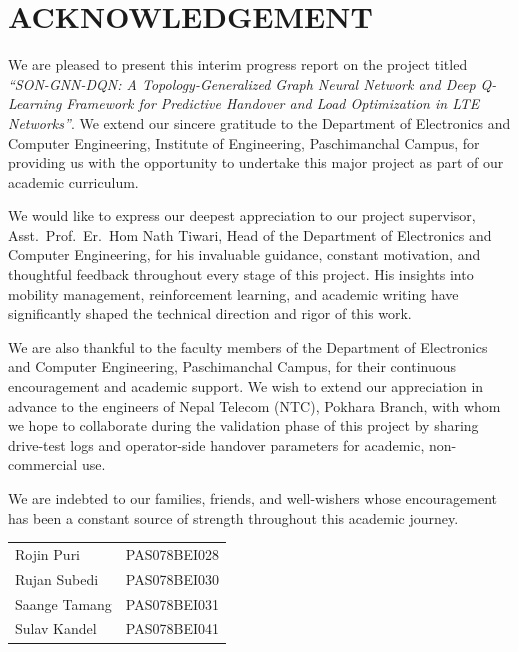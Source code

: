 \documentclass[12pt,a4paper,oneside]{report}
\begin{document}
\chapter*{ACKNOWLEDGEMENT}

We are pleased to present this interim progress report on the project
titled \textit{``SON-GNN-DQN: A Topology-Generalized Graph Neural Network
and Deep Q-Learning Framework for Predictive Handover and Load
Optimization in LTE Networks''}. We extend our sincere gratitude to the
Department of Electronics and Computer Engineering, Institute of
Engineering, Paschimanchal Campus, for providing us with the opportunity
to undertake this major project as part of our academic curriculum.

We would like to express our deepest appreciation to our project
supervisor, Asst.\ Prof.\ Er.\ Hom Nath Tiwari, Head of the Department of
Electronics and Computer Engineering, for his invaluable guidance,
constant motivation, and thoughtful feedback throughout every stage of
this project. His insights into mobility management, reinforcement
learning, and academic writing have significantly shaped the technical
direction and rigor of this work.

We are also thankful to the faculty members of the Department of
Electronics and Computer Engineering, Paschimanchal Campus, for their
continuous encouragement and academic support. We wish to extend our
appreciation in advance to the engineers of Nepal Telecom (NTC), Pokhara
Branch, with whom we hope to collaborate during the validation phase of
this project by sharing drive-test logs and operator-side handover
parameters for academic, non-commercial use.

We are indebted to our families, friends, and well-wishers whose
encouragement has been a constant source of strength throughout this
academic journey.

\vspace{1.2cm}
\begin{tabular}{ll}
Rojin Puri      & PAS078BEI028 \\[5pt]
Rujan Subedi    & PAS078BEI030 \\[5pt]
Saange Tamang   & PAS078BEI031 \\[5pt]
Sulav Kandel    & PAS078BEI041 \\
\end{tabular}

\end{document}
